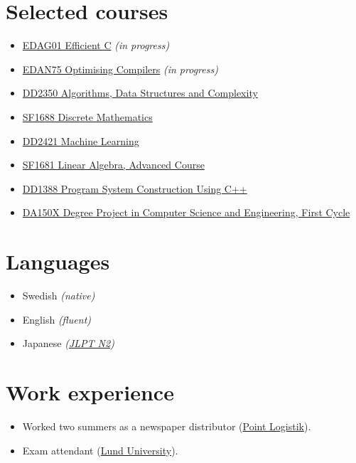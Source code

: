 \documentclass[11pt]{article}
\begin{document}
\section{Selected courses}
\vspace*{-14pt}
\begin{multicols}{2}
\begin{itemize}
    \item \href{https://kurser.lth.se/lot/course-syllabus-en/23_24/EDAG01}{EDAG01 Efficient C} \textit{(in progress)}
    \item \href{https://kurser.lth.se/lot/course-syllabus-en/23_24/EDAN75}{EDAN75 Optimising Compilers} \textit{(in progress)}
    \item \href{https://www.kth.se/student/kurser/kurs/DD2350?l=en}{DD2350 Algorithms, Data Structures and Complexity}
    \item \href{https://www.kth.se/student/kurser/kurs/SF1688?l=en}{SF1688 Discrete Mathematics}
    \item \href{https://www.kth.se/student/kurser/kurs/DD2421?l=en}{DD2421 Machine Learning}
    \item \href{https://www.kth.se/student/kurser/kurs/SF1681?l=en}{SF1681 Linear Algebra, Advanced Course}
    \item \href{https://www.kth.se/student/kurser/kurs/DD1388?l=en}{DD1388 Program System Construction Using C++}
    \item \href{https://www.kth.se/student/kurser/kurs/DA150X?l=en}{DA150X Degree Project in Computer Science and Engineering, First Cycle}
\end{itemize}
\end{multicols}

\section{Languages}
\begin{itemize}
    \item Swedish \textit{(native)}
    \item English \textit{(fluent)}
    \item Japanese \textit{(\href{https://www.jlpt.jp/e/about/levelsummary.html}{JLPT N2})}
\end{itemize}

\section{Work experience}
\begin{itemize}
    \item Worked two summers as a newspaper distributor (\href{https://www.pointlogistik.se/}{Point Logistik}).
    \item Exam attendant (\href{https://www.lth.se/english/}{Lund University}).
\end{itemize}
\end{document}
